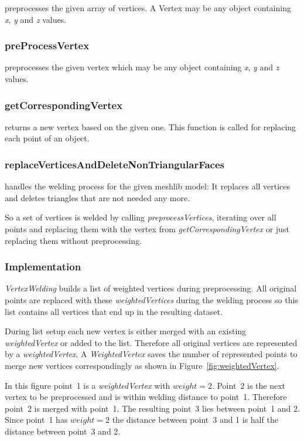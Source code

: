 \documentclass[../ClassicThesis.tex]{subfiles}
\begin{document}
preprocesses the given array of vertices. A Vertex may be any object containing \emph{x}, \emph{y} and \emph{z} values.

\subsubsection*{preProcessVertex}

preprocesses the given vertex which may be any object containing \emph{x}, \emph{y} and \emph{z} values.

\subsubsection*{getCorrespondingVertex}

returns a new vertex based on the given one. This function is called for replacing each point of an object.

\subsubsection*{replaceVerticesAndDeleteNonTriangularFaces}

handles the welding process for the given meshlib model: It replaces all vertices and deletes triangles that are not needed any more.


So a set of vertices is welded by calling \emph{preprocessVertices}, iterating over all points and replacing them with the vertex from \emph{getCorrespondingVertex} or just replacing them without preprocessing.


\subsubsection{Implementation}

\emph{VertexWelding} builds a list of weighted vertices during preprocessing. All original points are replaced with these \emph{weightedVertices} during the welding process so this list contains all vertices that end up in the resulting dataset.

During list setup each new vertex is either merged with an existing \emph{weightedVertex} or added to the list. Therefore all original vertices are represented by a \emph{weightedVertex}. A \emph{WeightedVertex} saves the number of represented points to merge new vertices correspondingly as shown in Figure~\ref{fig:weightedVertex}.

In this figure point~1 is a \emph{weightedVertex} with $weight = 2 $. Point~2 is the next vertex to be preprocessed and is within welding distance to point~1. Therefore point~2 is merged with point~1. The resulting point~3 lies between point~1 and 2. Since point~1 has $ weight = 2 $ the distance between point~3 and 1 is half the distance between point~3 and 2.
\end{document}
